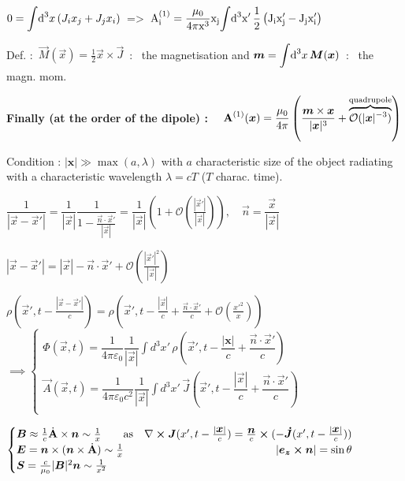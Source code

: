 \item $0 = \displaystyle{\int} \ud ^3x \, (J_i x_j + J_j x_i) \,$ => $\, \rm{A}^{(1)}_i = \dfrac{\mu_0}{4\pi x^3} x_j \displaystyle{\int} \ud ^3x' \, \frac{1}{2}\left(J_ix'_j - J_j x'_i \right)$

\item  Def. : $\, \vec{M}(\vec{x}) = \frac{1}{2} \vec{x}\times\vec{J} \,$ : \, the magnetisation and  $\vec{m} = \displaystyle{\int} \ud ^3x \, \vec{M}(\vec{x}) \, $ : \, the magn. mom.

\item \textbf{Finally (at the order of the dipole) :} $\quad  \vec{\rm{A}}^{(1)}(\vec{x}) =  \dfrac{\mu_0}{4\pi}\left(\dfrac{\vec{m}\times\vec{x}}{|\vec{x}|^3} + \overbrace{\mathcal{O}(|\vec{x}|^{-3})}^\text{quadrupole}\right)$\\ 
\squishend

\columnbreak


Condition : $|\textbf{x}| \gg \max(a, \lambda)$ with $a$ characteristic size of the object radiating with a characteristic wavelength $\lambda = cT$ ($T$ charac. time).
\squishlist
\item $\dfrac{1}{|\vec{x}-\vec{x}'|} = \dfrac{1}{|\vec{x}|}\dfrac{1}{1- \frac{\vec{n} \cdot \vec{x}'}{|\vec{x}|}} = \dfrac{1}{|\vec{x}|}\left(1+\mathcal{O}(\frac{|\vec{x}'|}{|\vec{x}|})\right), \quad \vec{n} = \dfrac{\vec{x}}{|\vec{x}|}$

\item $|\vec{x}-\vec{x}'| = |\vec{x}| - \vec{n} \cdot \vec{x}' + \mathcal{O}(\frac{|\vec{x}'|^2}{|\vec{x}|})$

\item $\rho(\vec{x}', t - \frac{|\vec{x} - \vec{x}'|}{c}) = \rho (\vec{x}', t-\frac{|\vec{x}|}{c} + \frac{\vec{n}\cdot\vec{x}'}{c} + \mathcal{O}(\frac{x'^2}{x}))$
\\
$      \implies
\begin{cases}
\Phi(\vec{x},t) = \dfrac{1}{4\pi\varepsilon_0}\dfrac{1}{|\vec{x}|}\displaystyle{\int} d^3x' \, \rho(\vec{x}',t- \dfrac{|\textbf{x}|}{c} + \dfrac{\vec{n} \cdot \vec{x}'}{c}) \\
\vec{A}(\vec{x},t) = \dfrac{1}{4\pi\varepsilon_0c^2} \dfrac{1}{|\vec{x}|} \displaystyle{\int} d^3x' \, \vec{J}(\vec{x}',t- \dfrac{|\vec{x}|}{c} + \dfrac{\vec{n} \cdot \vec{x}'}{c}) \\
\end{cases}$

\item $        \begin{cases}
\vec{B} \approx \frac{1}{c}\dot{\vec{\rm{A}}} \times \vec{n} \sim \frac{1}{x} \qquad \text{as} \quad\nabla \cross \vec{J}(x',t-\frac{|\vec{x}|}{c}) = \frac{\vec{n}}{c} \cross (-{\vec{\dot{{J}}}}(x',t-\frac{|\vec{x}|}{c}))\\
\vec{E} = \vec{n} \times (\vec{n} \times \dot{\vec{\rm{A}}}) \sim \frac{1}{x} \hfill |\vec{e_z} \cross \vec{n}|=\sin\theta \\
\vec{S} = \frac{c}{\mu_0} |\vec{B}|^2\vec{n} \sim \frac{1}{x^2}\\
\end{cases}$

